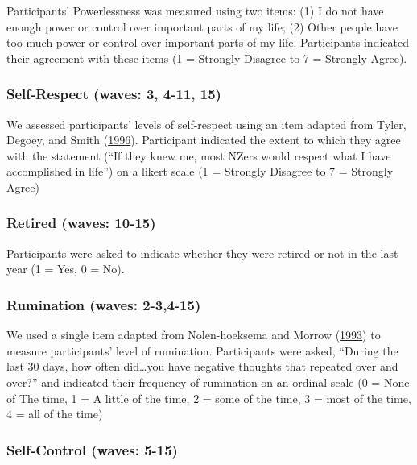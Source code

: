 \documentclass[
  singlecolumn]{report}
\begin{document}
Participants' Powerlessness was measured using two items: (1) I do not
have enough power or control over important parts of my life; (2) Other
people have too much power or control over important parts of my life.
Participants indicated their agreement with these items (1 = Strongly
Disagree to 7 = Strongly Agree).

\hypertarget{self-respect-waves-3-4-11-15}{%
\subsubsection{Self-Respect (waves: 3, 4-11,
15)}\label{self-respect-waves-3-4-11-15}}

We assessed participants' levels of self-respect using an item adapted
from Tyler, Degoey, and Smith
(\protect\hyperlink{ref-tyler_understanding_1996}{1996}). Participant
indicated the extent to which they agree with the statement (``If they
knew me, most NZers would respect what I have accomplished in life'') on
a likert scale (1 = Strongly Disagree to 7 = Strongly Agree)

\hypertarget{retired-waves-10-15}{%
\subsubsection{Retired (waves: 10-15)}\label{retired-waves-10-15}}

Participants were asked to indicate whether they were retired or not in
the last year (1 = Yes, 0 = No).

\hypertarget{rumination-waves-2-34-15}{%
\subsubsection{Rumination (waves:
2-3,4-15)}\label{rumination-waves-2-34-15}}

We used a single item adapted from Nolen-hoeksema and Morrow
(\protect\hyperlink{ref-nolen-hoeksema_effects_1993}{1993}) to measure
participants' level of rumination. Participants were asked, ``During the
last 30 days, how often did\ldots you have negative thoughts that
repeated over and over?'' and indicated their frequency of rumination on
an ordinal scale (0 = None of The time, 1 = A little of the time, 2 =
some of the time, 3 = most of the time, 4 = all of the time)

\hypertarget{self-control-waves-5-15}{%
\subsubsection{Self-Control (waves:
5-15)}\label{self-control-waves-5-15}}
\end{document}
